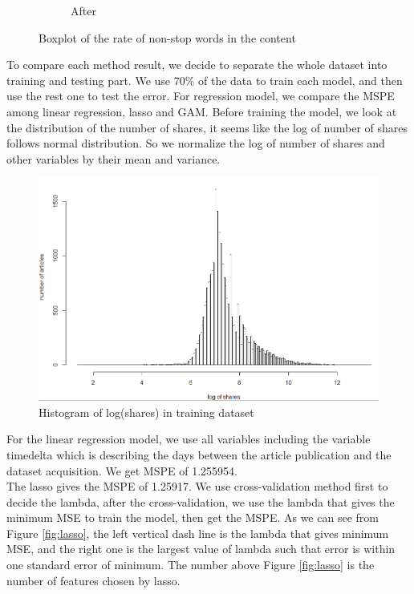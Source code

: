 \documentclass[12pt]{article}
\begin{document}
\begin{figure}[h]
\begin{subfigure}[h]{0.4\textwidth}
        \caption{After}
    \end{subfigure}
    \caption{Boxplot of the rate of non-stop words in the content}
    \label{fig:boxplot}
\end{figure}

To compare each method result, we decide to separate the whole dataset into training and testing part. We use 70\% of the data to train each model, and then use the rest one to test the error. For regression model, we compare the MSPE among linear regression, lasso and GAM. Before training the model, we look at the distribution of the number of shares, it seems like the log of number of shares follows normal distribution. So we normalize the log of number of shares and other variables by their mean and variance.\\

    \begin{figure}[h]
        \centering
        \includegraphics[width=0.85\linewidth]{logy.png}
        \caption{Histogram of log(shares) in training dataset}
        \label{fig:logy}
    \end{figure}

For the linear regression model, we use all variables including the variable timedelta which is describing the days between the article publication and the dataset acquisition. We get MSPE of 1.255954. \\

The lasso gives the MSPE of 1.25917. We use cross-validation method first to decide the lambda, after the cross-validation, we use the lambda that gives the minimum MSE to train the model, then get the MSPE. As we can see from Figure \ref{fig:lasso}, the left vertical dash line is the lambda that gives minimum MSE, and the right one is the largest value of lambda such that error is within one standard error of minimum. The number above Figure \ref{fig:lasso} is the number of features chosen by lasso. \\
\end{document}

